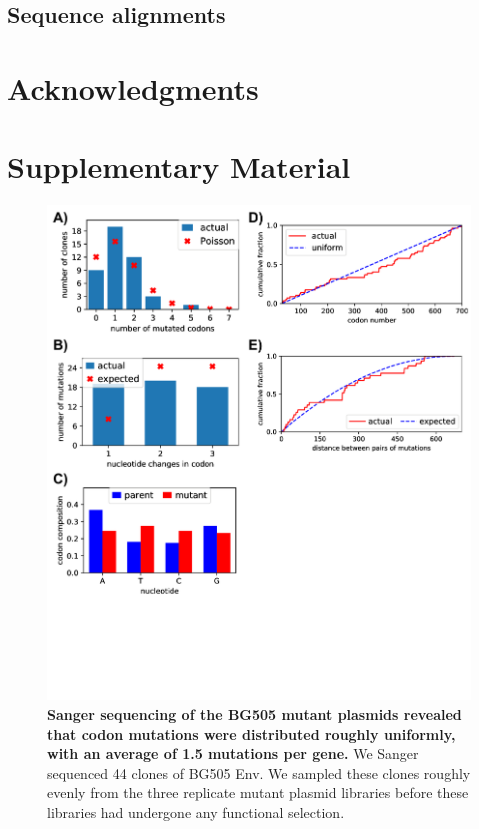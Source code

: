 \documentclass[9pt,lineno]{elife}
\begin{document}
\subsection*{Sequence alignments}

\section{Acknowledgments}

\nocite{*} %


\section*{Supplementary Material}

\begin{figure}
\centerline{\includegraphics[width=5in]{figures/sanger_sequencing_supp/sanger_sequencing_supp}}
\caption{\label{suppfig:sanger_sequencing_supp}
{\bf Sanger sequencing of the BG505 mutant plasmids revealed that codon mutations were distributed roughly uniformly, with an average of 1.5 mutations per gene.}
We Sanger sequenced 44 clones of BG505 Env.
We sampled these clones roughly evenly from the three replicate mutant plasmid libraries before these libraries had undergone any functional selection. 
}
\end{figure}
\end{document}
